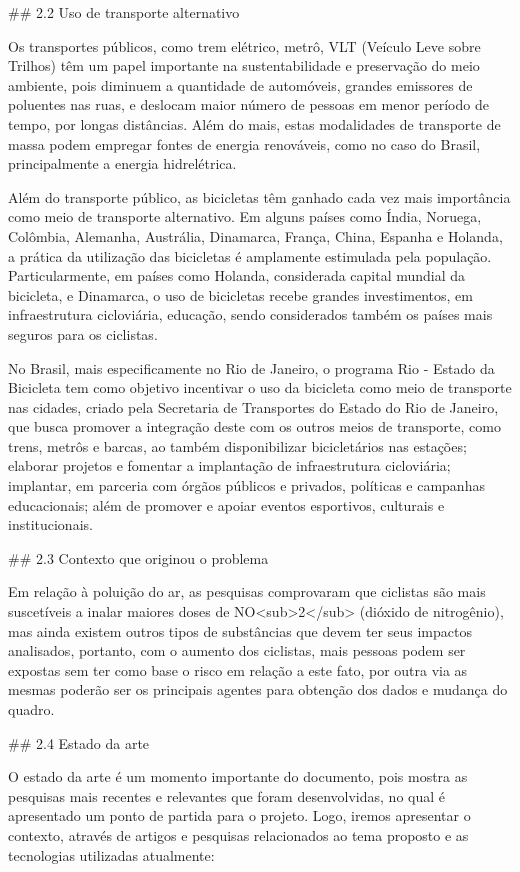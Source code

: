 ## 2.2 Uso de transporte alternativo

Os transportes públicos, como trem elétrico, metrô, VLT (Veículo Leve sobre Trilhos) têm um papel 
importante na sustentabilidade e preservação do meio ambiente, pois diminuem a quantidade de 
automóveis, grandes emissores de poluentes nas ruas, e deslocam maior número de pessoas em menor 
período de tempo, por longas distâncias. Além do mais, estas modalidades de transporte de massa podem 
empregar fontes de energia renováveis, como no caso do Brasil, principalmente a energia hidrelétrica. 

Além do transporte público, as bicicletas têm ganhado cada vez mais importância  como meio de 
transporte alternativo. Em alguns países como Índia, Noruega, Colômbia, Alemanha, Austrália, 
Dinamarca, França, China, Espanha e Holanda, a prática da utilização das bicicletas é amplamente 
estimulada pela população. Particularmente, em países como Holanda, considerada capital mundial da 
bicicleta, e Dinamarca, o uso de bicicletas recebe grandes investimentos, em infraestrutura 
cicloviária, educação, sendo considerados também os países mais seguros para os ciclistas.

No Brasil, mais especificamente no Rio de Janeiro, o programa Rio - Estado da Bicicleta tem como 
objetivo incentivar o uso da bicicleta como meio de transporte nas cidades, criado pela Secretaria de 
Transportes do Estado do Rio de Janeiro, que busca promover a integração deste com os outros meios de 
transporte, como trens, metrôs e barcas, ao também disponibilizar bicicletários nas estações; 
elaborar projetos e fomentar a implantação de infraestrutura cicloviária; implantar, em parceria com 
órgãos públicos e privados, políticas e campanhas educacionais; além de promover e apoiar eventos 
esportivos, culturais e institucionais.

## 2.3 Contexto que originou o problema

Em relação à poluição do ar, as pesquisas comprovaram que ciclistas são mais suscetíveis a inalar 
maiores doses de NO<sub>2</sub> (dióxido de nitrogênio), mas ainda existem outros tipos de 
substâncias que devem ter seus impactos analisados, portanto, com o aumento dos ciclistas, mais 
pessoas podem ser expostas sem ter como base o risco em relação a este fato, por outra via as mesmas 
poderão ser os principais agentes para obtenção dos dados e mudança do quadro.

## 2.4 Estado da arte

O estado da arte é um momento importante do documento, pois mostra as pesquisas mais recentes e 
relevantes que foram desenvolvidas, no qual é apresentado um ponto de partida para o projeto. Logo, 
iremos apresentar o contexto, através de artigos e pesquisas relacionados ao tema proposto e as 
tecnologias utilizadas atualmente:

